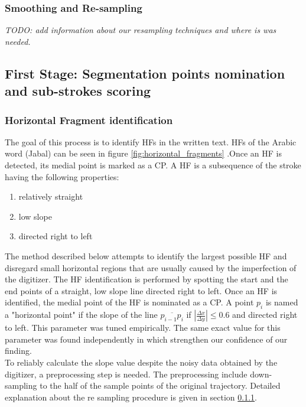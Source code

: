 \documentclass[journal,compsoc]{IEEEtran}
\begin{document}
\subsubsection{Smoothing and Re-sampling}
\emph{TODO: add information about our resampling techniques and where is was needed.}

\subsection{First Stage: Segmentation points nomination and sub-strokes scoring}
\subsubsection{Horizontal Fragment identification}
The goal of this process is to identify HFs in the written text. HFs of the Arabic word  (Jabal) can be seen in figure \ref{fig:horizontal_fragments} .Once an HF is detected, its medial point is marked as a CP. A HF is a subsequence of the stroke having the following properties: 
\begin{enumerate}
\item relatively straight
\item low slope
\item directed right to left 
\end{enumerate}
The method described below attempts to identify the largest possible HF and disregard small horizontal regions that are usually caused by the imperfection of the digitizer. The HF identification is performed by spotting the start and the end points of a straight, low slope line directed right to left. Once an HF is identified, the medial point of the HF is nominated as a CP.
A point $p_{i}$ is named a "horizontal point" if the slope of the line $\overline{p_{i-1}p_{i}}$ if $\left|\frac{\Delta x}{\Delta y}\right|\leq0.6$ and directed right to left. This parameter was tuned empirically.
The same exact value for this parameter was found independently in \cite{daifallah2009recognition} which strengthen our confidence of our finding.\\
To reliably calculate the slope value despite the noisy data obtained by the digitizer, a preprocessing step is needed. The preprocessing include down-sampling to the half of the sample points of the original trajectory. Detailed explanation about the re sampling procedure is given in section \ref{}.
\end{document}
